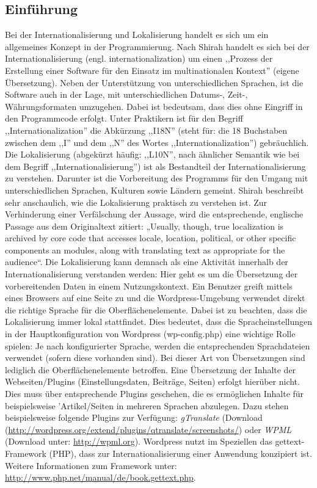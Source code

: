 \subsection{Einführung}\label{allgemeinesil}
Bei der Internationalisierung und Lokalisierung handelt es sich um ein allgemeines Konzept in der Programmierung. \newline
Nach Shirah handelt es sich bei der Internationalisierung (engl. internationalization)  um einen ,,Prozess der Erstellung einer Software für den Einsatz im multinationalen Kontext'' (eigene Übersetzung). Neben der Unterstützung von unterschiedlichen Sprachen, ist die Software auch in der Lage, mit unterschiedlichen Datums-, Zeit-, Währungsformaten umzugehen. Dabei ist bedeutsam, dass dies ohne Eingriff in den Programmcode erfolgt. Unter Praktikern ist für den Begriff ,,Internationalization'' die Abkürzung ,,I18N'' (steht für: die 18 Buchstaben zwischen dem ,,I'' und dem ,,N'' des Wortes ,,Internationalization'') gebräuchlich.\newline
Die Lokalisierung (abgekürzt häufig: ,,L10N'', nach ähnlicher Semantik wie bei dem Begriff ,,Internationalisierung'') ist als Bestandteil der Internationalisierung zu verstehen. Darunter ist die Vorbereitung des Programms für den Umgang mit unterschiedlichen Sprachen, Kulturen sowie Ländern gemeint.  Shirah beschreibt sehr anschaulich, wie die Lokalisierung praktisch zu verstehen ist. Zur Verhinderung einer Verfälschung der Aussage, wird  die entsprechende, englische Passage aus dem Originaltext zitiert: „Usually, though, true localization is archived by core code that accesses locale, location, political, or other specific components an modules, along with translating text as appropriate for the audience“.\newline
Die Lokalisierung kann demnach als eine Aktivität innerhalb der Internationalisierung verstanden werden: Hier geht es um die Übersetzung der vorbereitenden Daten in einem Nutzungskontext. Ein Benutzer greift mittels eines Browsers auf eine Seite zu und die Wordpress-Umgebung verwendet direkt die richtige Sprache für die Oberflächenelemente. Dabei ist  zu beachten, dass die Lokalisierung immer lokal stattfindet. Dies bedeutet, dass die Spracheinstellungen in der Hauptkonfiguration von Wordpress (wp-config.php) eine wichtige Rolle spielen: Je nach konfigurierter Sprache, werden die entsprechenden Sprachdateien verwendet (sofern diese vorhanden sind). Bei dieser Art von Übersetzungen sind lediglich die Oberflächenelemente betroffen. Eine Übersetzung der Inhalte der Webseiten/Plugins (Einstellungsdaten, Beiträge, Seiten) erfolgt hierüber nicht. Dies muss über entsprechende Plugins geschehen, die es ermöglichen Inhalte für beispielsweise 
'Artikel/Seiten in mehreren Sprachen abzulegen. Dazu stehen beispielsweise folgende Plugins zur Verfügung: \emph{gTranslate} (Download (\url{http://wordpress.org/extend/plugins/qtranslate/screenshots/})  oder \emph{WPML} (Download unter: \url{http://wpml.org}).\newline
Wordpress nutzt im Speziellen das gettext-Framework (PHP), dass zur Internationalisierung einer Anwendung konzipiert ist. Weitere Informationen zum Framework unter: \url{http://www.php.net/manual/de/book.gettext.php}.
